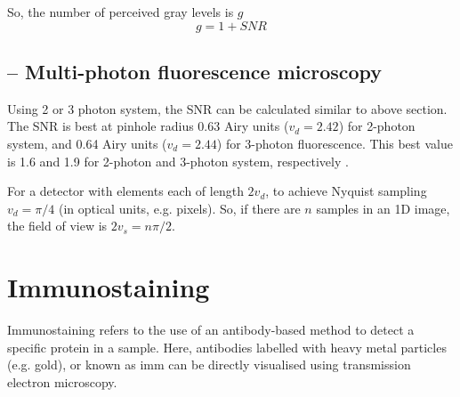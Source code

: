So, the number of perceived gray levels is $g$
\begin{equation}
g = 1 + SNR
\end{equation} 

\subsection{-- Multi-photon fluorescence microscopy}

Using 2 or 3 photon system, the SNR can be calculated similar to above section.
The SNR is best at pinhole radius 0.63 Airy units ($v_d=2.42$) for 2-photon
system, and 0.64 Airy units ($v_d=2.44$) for 3-photon fluorescence. This best
value is 1.6 and 1.9 for 2-photon and 3-photon system, respectively
\citep{sheppard2006}.


For a detector with elements each of length $2v_d$, to achieve Nyquist sampling
$v_d=\pi/4$ (in optical units, e.g. pixels). So, if there are $n$ samples in an
1D image, the field of view is $2v_s=n\pi/2$.

\section{Immunostaining}
\label{sec:immunostaining}

Immunostaining refers to the use of an antibody-based method to detect a specific protein in a sample. 
Here, antibodies labelled with heavy metal particles (e.g. gold), or known as
imm can be directly visualised using transmission electron microscopy.
